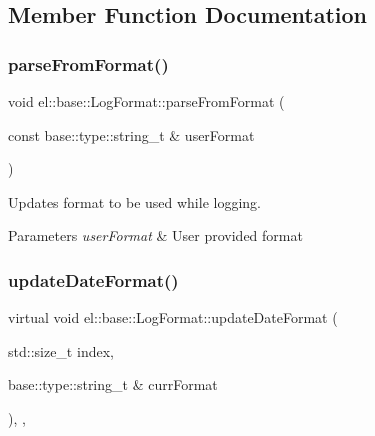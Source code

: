 \subsection{Member Function Documentation}
\mbox{\label{classel_1_1base_1_1_log_format_ab7c1b15cfdad24cfbc6dbced8b9d66eb}} 
\subsubsection{\texorpdfstring{parse\+From\+Format()}{parseFromFormat()}}
{\footnotesize\ttfamily void el\+::base\+::\+Log\+Format\+::parse\+From\+Format (\begin{DoxyParamCaption}\item[{const base\+::type\+::string\+\_\+t \&}]{user\+Format }\end{DoxyParamCaption})\hspace{0.3cm}{\ttfamily [inline]}}



Updates format to be used while logging. 


\begin{DoxyParams}{Parameters}
{\em user\+Format} & User provided format \\
\hline
\end{DoxyParams}
\mbox{\label{classel_1_1base_1_1_log_format_a3146651eadd6b1164bde74e5b273ec94}} 
\subsubsection{\texorpdfstring{update\+Date\+Format()}{updateDateFormat()}}
{\footnotesize\ttfamily virtual void el\+::base\+::\+Log\+Format\+::update\+Date\+Format (\begin{DoxyParamCaption}\item[{std\+::size\+\_\+t}]{index,  }\item[{base\+::type\+::string\+\_\+t \&}]{curr\+Format }\end{DoxyParamCaption})\hspace{0.3cm}{\ttfamily [inline]}, {\ttfamily [protected]}, {\ttfamily [virtual]}}



